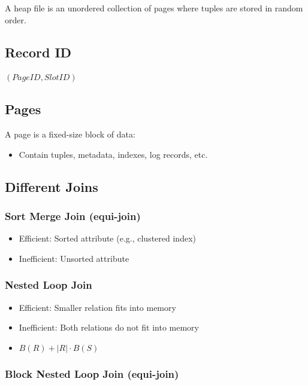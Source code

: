 \documentclass{article}
\begin{document}
A heap file is an unordered collection of pages where tuples are stored in
random order.

\subsection{Record ID}

\((Page ID, Slot ID)\)

\subsection{Pages}

A page is a fixed-size block of data:

\begin{itemize}
    \item Contain tuples, metadata, indexes, log records, etc.
\end{itemize}

\subsection{Different Joins}

\subsubsection{Sort Merge Join (equi-join)}

\begin{itemize}
    \item Efficient: Sorted attribute (e.g., clustered index)
    \item Inefficient: Unsorted attribute
\end{itemize}

\subsubsection{Nested Loop Join}

\begin{itemize}
    \item Efficient: Smaller relation fits into memory
    \item Inefficient: Both relations do not fit into memory
    \item \(B(R) + |R| \cdot B(S)\)
\end{itemize}

\subsubsection{Block Nested Loop Join (equi-join)}
\end{document}
